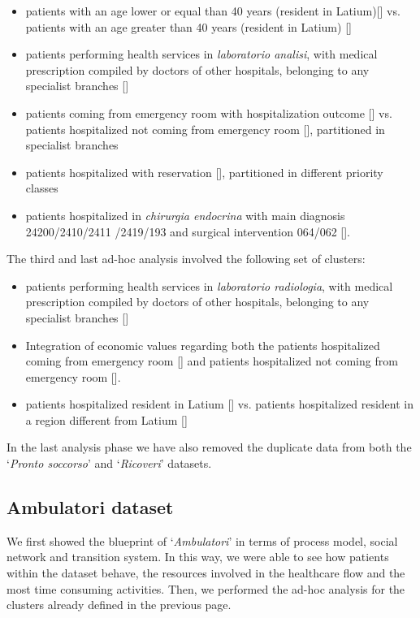 \begin{itemize}
\item patients with an age lower or equal than 40 years (resident in Latium)[] vs. patients with an age greater than 40 years (resident in Latium) []
\item patients performing health services in \textit{laboratorio analisi}, with medical prescription compiled by doctors of other hospitals, belonging to any specialist branches []
\item patients coming from emergency room with hospitalization outcome [] vs. patients hospitalized not coming from emergency room [], partitioned in specialist branches
\item patients hospitalized with reservation [], partitioned in different priority classes
\item patients hospitalized in \textit{chirurgia endocrina} with main diagnosis 24200/2410/2411 /2419/193 and surgical intervention 064/062 [].
\end{itemize}
The third and last ad-hoc analysis involved the following set of clusters:
\begin{itemize}
\item patients performing health services in \textit{laboratorio radiologia}, with medical prescription compiled by doctors of other hospitals, belonging to any specialist branches []
\item Integration of economic values regarding both the patients hospitalized coming from emergency room [] and patients hospitalized not coming from emergency room [].
\item patients hospitalized resident in Latium [] vs. patients hospitalized resident in a region different from Latium  []
\end{itemize}
In the last analysis phase we have also removed the duplicate data from both the `\textit{Pronto soccorso}' and `\textit{Ricoveri}' datasets. 
\newpage
\subsection{Ambulatori dataset} \label{analysis:1}
We first showed the blueprint of `\textit{Ambulatori}' in terms of process model, social network and transition system. In this way, we were able to see how patients within the dataset behave, the resources involved in the healthcare flow and the most time consuming activities. Then, we performed the ad-hoc analysis for the clusters already defined in the previous page.

